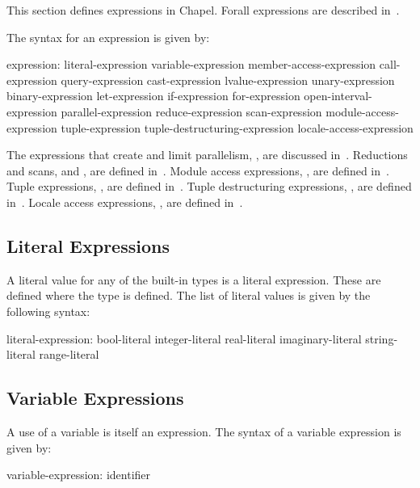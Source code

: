 \label{Expressions}

This section defines expressions in Chapel.  Forall expressions are
described in~.

The syntax for an expression is given by:
\begin{syntax}
expression:
  literal-expression
  variable-expression
  member-access-expression
  call-expression
  query-expression
  cast-expression
  lvalue-expression
  unary-expression
  binary-expression
  let-expression
  if-expression
  for-expression
  open-interval-expression
  parallel-expression
  reduce-expression
  scan-expression
  module-access-expression
  tuple-expression
  tuple-destructuring-expression
  locale-access-expression
\end{syntax}

The expressions that create and limit
parallelism, , are discussed
in~.  Reductions and
scans,  and , are
defined in~.  Module access
expressions, , are defined
in~.  Tuple
expressions, , are defined
in~.  Tuple destructuring
expressions, , are defined
in~.  Locale access
expressions, , are defined
in~.

\subsection{Literal Expressions}
\label{Literal_Expressions}

A literal value for any of the built-in types is a literal expression.
These are defined where the type is defined.  The list of literal
values is given by the following syntax:
\begin{syntax}
literal-expression:
  bool-literal
  integer-literal
  real-literal
  imaginary-literal
  string-literal
  range-literal
\end{syntax}

\subsection{Variable Expressions}
\label{Variable_Expressions}

A use of a variable is itself an expression.  The syntax of a variable
expression is given by:
\begin{syntax}
variable-expression:
  identifier
\end{syntax}

